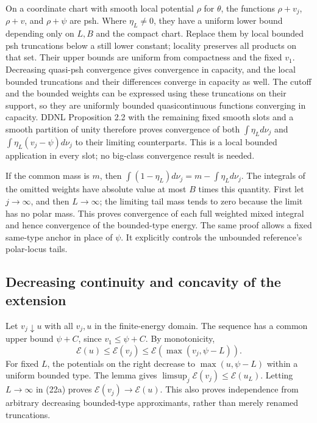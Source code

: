 \documentclass[
  11pt,
]{article}
\begin{document}
On a coordinate chart with smooth local potential \(\rho\) for
\(\theta\), the functions \(\rho+v_j\), \(\rho+v\), and \(\rho+\psi\)
are psh. Where \(\eta_L\ne0\), they have a uniform lower bound depending
only on \(L,B\) and the compact chart. Replace them by local bounded psh
truncations below a still lower constant; locality preserves all
products on that set. Their upper bounds are uniform from compactness
and the fixed \(v_1\). Decreasing quasi-psh convergence gives
convergence in capacity, and the local bounded truncations and their
differences converge in capacity as well. The cutoff and the bounded
weights can be expressed using these truncations on their support, so
they are uniformly bounded quasicontinuous functions converging in
capacity. DDNL Proposition 2.2 with the remaining fixed smooth slots and
a smooth partition of unity therefore proves convergence of both
\(\int\eta_Ld\nu_j\) and \(\int\eta_L(v_j-\psi)d\nu_j\) to their
limiting counterparts. This is a local bounded application in every
slot; no big-class convergence result is needed.

If the common mass is \(m\), then
\(\int(1-\eta_L)d\nu_j=m-\int\eta_Ld\nu_j\). The integrals of the
omitted weights have absolute value at most \(B\) times this quantity.
First let \(j\to\infty\), and then \(L\to\infty\); the limiting tail
mass tends to zero because the limit has no polar mass. This proves
convergence of each full weighted mixed integral and hence convergence
of the bounded-type energy. The same proof allows a fixed same-type
anchor in place of \(\psi\). It explicitly controls the unbounded
reference's polar-locus tails.

\subsection{Decreasing continuity and concavity of the
extension}\label{decreasing-continuity-and-concavity-of-the-extension}

Let \(v_j\downarrow u\) with all \(v_j,u\) in the finite-energy domain.
The sequence has a common upper bound \(\psi+C\), since
\(v_1\leq\psi+C\). By monotonicity, \[
\mathcal E(u)\leq\mathcal E(v_j)\leq\mathcal E(\max(v_j,\psi-L)).
\] For fixed \(L\), the potentials on the right decrease to
\(\max(u,\psi-L)\) within a uniform bounded type. The lemma gives
\(\limsup_j\mathcal E(v_j)\leq\mathcal E(u_L)\). Letting \(L\to\infty\)
in (22a) proves \(\mathcal E(v_j)\to\mathcal E(u)\). This also proves
independence from arbitrary decreasing bounded-type approximants, rather
than merely renamed truncations.
\end{document}
